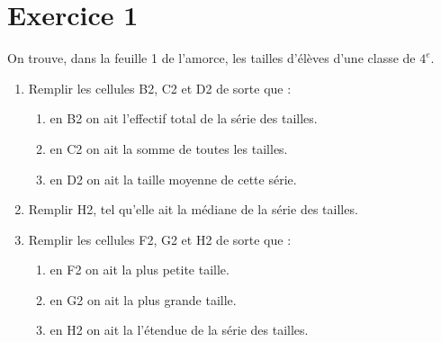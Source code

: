 \def\authors{PESIN - CADOT - COURTIN}
\def\date{(activité originale \href{http://rjorro.free.fr/vil9/4ieme/4e_DOCII4_TICEmoyennes.pdf}{Mme JORRO})}
\def\theme{Activité : Statistiques}
\def\imgPath{libre-office/}
\vspace*{-1cm}



\vspace*{-0.5cm}

\section*{Exercice 1}

On trouve,
dans la feuille 1 de l'amorce, les tailles d'élèves d'une classe de $4^e$.

\begin{enumerate}
    \item Remplir les cellules B2, C2 et D2 de sorte que : 
    \begin{enumerate}
        \item en B2 on ait l'effectif total de la série des tailles.
        \item en C2 on ait la somme de toutes les tailles.
        \item en D2 on ait la taille moyenne de cette série.
    \end{enumerate}
    \item Remplir H2, tel qu'elle ait la médiane de la série des tailles.
    \item Remplir les cellules F2, G2 et H2 de sorte que : 
    \begin{enumerate}
        \item en F2 on ait la plus petite taille.
        \item en G2 on ait la plus grande taille.
        \item en H2 on ait la l'étendue de la série des tailles.
    \end{enumerate}
\end{enumerate}

